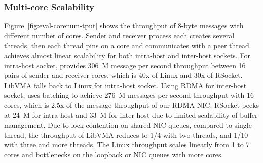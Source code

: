 \subsubsection{Multi-core Scalability}
\quad





Figure~\ref{fig:eval-corenum-tput} shows the throughput of 8-byte messages with different number of cores.
Sender and receiver process each creates several threads, then each thread pins on a core and communicates with a peer thread.
\sys achieves almost linear scalability for both intra-host and inter-host sockets.
For intra-host socket, \sys provides 306~M message per second throughput between 16 pairs of sender and receiver cores, which is 40x of Linux and 30x of RSocket.
LibVMA falls back to Linux for intra-host socket.
Using RDMA for inter-host socket, \sys uses batching to achieve 276~M messages per second throughput with 16 cores, which is 2.5x of the message throughput of our RDMA NIC.
RSocket peeks at 24~M for intra-host and 33~M for inter-host due to limited scalability of buffer management.
Due to lock contention on shared NIC queues, compared to single thread, the throughput of LibVMA reduces to 1/4 with two threads, and 1/10 with three and more threads.
The Linux throughput scales linearly from 1 to 7 cores and bottlenecks on the loopback or NIC queues with more cores.

